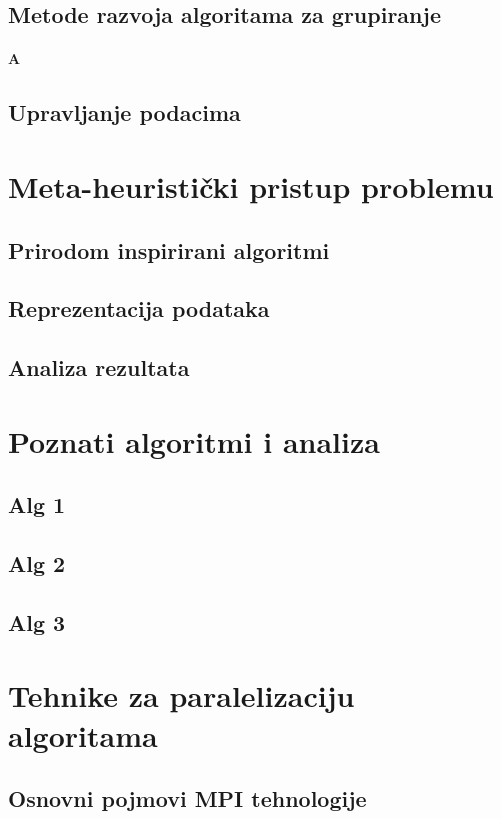 \documentclass[a4paper,twoside,12pt]{memoir} %
\begin{document}
\section[Metode razvoja algoritama za grupiranje][metode razvoja]{Metode razvoja algoritama za grupiranje}
\subsubsection{A}
\section[Upravljanje podacima][upravljanje-podacima]{Upravljanje podacima}
\label{sec:upravljanje-pod}
\chapter[Metaheuristike]{Meta-heuristički pristup problemu}
\section[Prirodom inspirirani algoritmi][prirodni-algoritmi]{Prirodom inspirirani algoritmi}
\section{Reprezentacija podataka}
\section{Analiza rezultata}
\chapter{Poznati algoritmi i analiza}
\section{Alg 1}
\section{Alg 2}
\section{Alg 3}
\chapter{Tehnike za paralelizaciju algoritama}
\section[Osnovni pojmovi MPI tehnologije][mpi]{Osnovni pojmovi MPI tehnologije}
\end{document}
